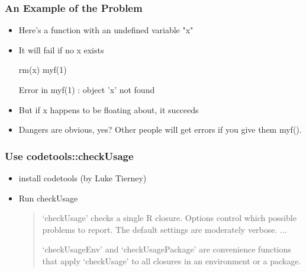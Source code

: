 \documentclass[10pt,english]{beamer}
\begin{document}
\begin{frame}[containsverbatim]
  \frametitle{An Example of the Problem}

   \begin{itemize}

  \item Here's a function with an undefined variable "x"


  \item It will fail if no x exists
\begin{Schunk}
  \begin{Sinput}
rm(x)
myf(1)
  \end{Sinput}
  \begin{Soutput}
Error in myf(1) : object 'x' not found
  \end{Soutput}
\end{Schunk}

\item But if x happens to be floating about, it succeeds


\item Dangers are obvious, yes? Other people will get errors if you
give them myf().

\end{itemize}
\end{frame}




\begin{frame}[containsverbatim]
  \frametitle{Use codetools::checkUsage}
  \begin{itemize}

  \item install codetools (by Luke Tierney)

  \item Run checkUsage

    \begin{quotation}
       ‘checkUsage’ checks a single R closure.  Options control which
     possible problems to report.  The default settings are moderately
     verbose. $\ldots$

     ‘checkUsageEnv’ and ‘checkUsagePackage’ are convenience functions
     that apply ‘checkUsage’ to all closures in an environment or a
     package.
    \end{quotation}





\end{itemize}
\end{frame}
\end{document}
